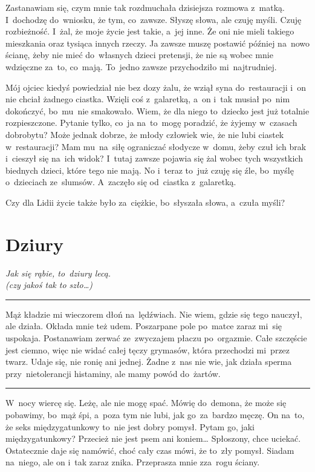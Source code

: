 \documentclass[9pt, a5paper]{memoir}
\begin{document}
Zastanawiam się, czym mnie tak rozdmuchała dzisiejsza rozmowa z~matką. I~dochodzę do~wniosku, że tym, co~zawsze. Słyszę słowa, ale czuję myśli. Czuję rozbieżność. I~żal, że moje życie jest takie, a~jej inne. Że oni nie mieli takiego mieszkania oraz tysiąca innych rzeczy. Ja zawsze muszę postawić później na~nowo ścianę, żeby nie mieć do~własnych dzieci pretensji, że nie są wobec mnie wdzięczne za~to, co~mają. To~jedno zawsze przychodziło mi~najtrudniej.

Mój ojciec kiedyś powiedział nie bez dozy żalu, że wziął syna do~restauracji i~on nie chciał żadnego ciastka. Wzięli coś z~galaretką, a~on i~tak musiał po~nim dokończyć, bo~mu~nie smakowało. Wiem, że dla niego to~dziecko jest już totalnie rozpieszczone. Pytanie tylko, co~ja na~to~mogę poradzić, że żyjemy w~czasach dobrobytu? Może jednak dobrze, że młody człowiek wie, że nie lubi ciastek w~restauracji? Mam mu~na~siłę ograniczać słodycze w~domu, żeby czuł ich brak i~cieszył się na~ich widok? I~tutaj zawsze pojawia się żal wobec tych wszystkich biednych dzieci, które tego nie mają. No i~teraz to~już czuję się źle, bo~myślę o~dzieciach ze~slumsów. A~zaczęło się od~ciastka z~galaretką.

Czy dla Lidii życie także było za~ciężkie, bo~słyszała słowa, a~czuła myśli?

\newpage
\section{Dziury}
{
\itshape
Jak się rąbie, to~dziury lecą.\\
(czy jakoś tak to szło\dots)
}

\fancybreak{* \quad * \quad *}

Mąż kładzie mi wieczorem dłoń na~lędźwiach. Nie wiem, gdzie się tego nauczył, ale działa. Okłada mnie też udem. Poszarpane pole po~matce zaraz mi~się uspokaja. Postanawiam zerwać ze~zwyczajem płaczu po~orgazmie. Całe szczęście jest ciemno, więc nie widać całej tęczy grymasów, która przechodzi mi~przez twarz. Udaje się, nie ronię ani jednej. Żadne z~nas nie wie, jak działa sperma przy~nietolerancji histaminy, ale mamy powód do~żartów.

\fancybreak{* \quad * \quad *}

W~nocy wiercę się. Leżę, ale nie mogę spać. Mówię do~demona, że może się pobawimy, bo~mąż śpi, a~poza tym nie lubi, jak go~za~bardzo męczę. On na~to, że seks międzygatunkowy to~nie jest dobry pomysł. Pytam go, jaki międzygatunkowy? Przecież nie jest psem ani koniem\dots{} Spłoszony, chce uciekać. Ostatecznie daje się namówić, choć cały czas mówi, że to~zły pomysł. Siadam na~niego, ale on i~tak zaraz znika. Przeprasza mnie zza~rogu ściany.
\end{document}
